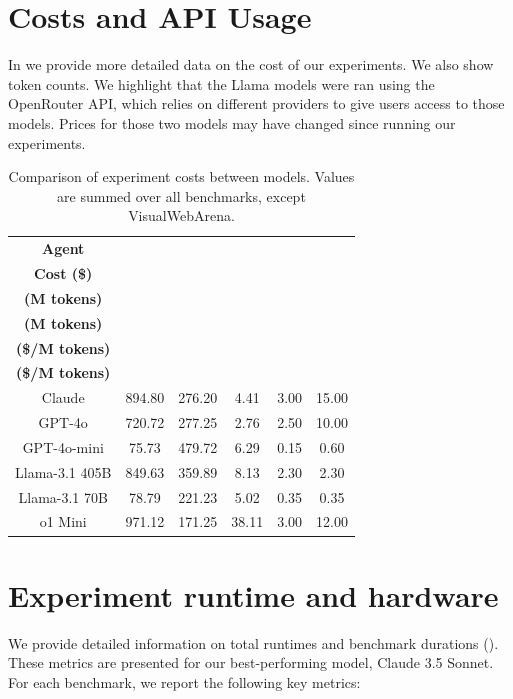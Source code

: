 \documentclass[10pt]{article} %
\begin{document}
\section{Costs and API Usage} \label{app:cost}

In  we provide more detailed data on the cost of our experiments. We also show token counts. We highlight that the Llama models were ran using the OpenRouter API, which relies on different providers to give users access to those models. Prices for those two models may have changed since running our experiments. 

\begin{table}[h]
    \centering
    \footnotesize
    \begin{tabular}{|c|c|c|c|c|c|}
        \hline
        \textbf{Agent} & \makecell{\textbf{Total} \\ \textbf{Cost (\$)}} & \makecell{\textbf{Input Tokens} \\ \textbf{ (M tokens)}} & \makecell{\textbf{Output Tokens} \\ \textbf{ (M tokens)}} & \makecell{\textbf{API Input Cost} \\ \textbf{(\$/M tokens)}} & \makecell{\textbf{API Output Cost} \\ \textbf{(\$/M tokens)}} \\        \hline
        Claude  & 894.80  & 276.20  & 4.41  & 3.00  & 15.00 \\
        GPT-4o                             & 720.72  & 277.25  & 2.76  & 2.50  & 10.00 \\
        GPT-4o-mini                         & 75.73   & 479.72  & 6.29  & 0.15  & 0.60  \\
        Llama-3.1 405B & 849.63  & 359.89  & 8.13  & 2.30  & 2.30 \\
        Llama-3.1 70B  & 78.79   & 221.23  & 5.02  & 0.35  & 0.35  \\
        o1 Mini          & 971.12  & 171.25  & 38.11 & 3.00  & 12.00 \\
        \hline
    \end{tabular}
    \caption{Comparison of experiment costs between models. Values are summed over all benchmarks, except VisualWebArena.}
    \label{tab:api_costs}
\end{table}

\section{Experiment runtime and hardware}\label{app:runtime}
We provide detailed information on total runtimes and benchmark durations (). These metrics are presented for our best-performing model, Claude 3.5 Sonnet. For each benchmark, we report the following key metrics:
\end{document}
